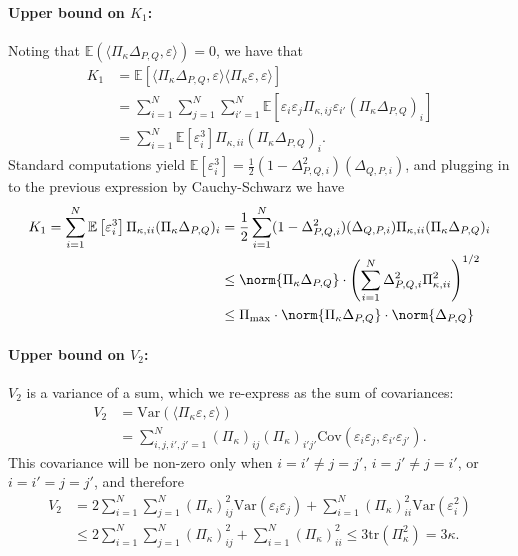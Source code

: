 \documentclass{article}
\newcommand{\dotp}[2]{\langle #1, #2 \rangle}
\newcommand{\Var}{\mathrm{Var}}
\newcommand{\Cov}{\mathrm{Cov}}
\newcommand{\1}{\mathbf{1}}
\newcommand{\Ebb}{\mathbb{E}}
\theoremstyle{alden}
\theoremstyle{aldenthm}
\theoremstyle{definition}
\theoremstyle{remark}
\begin{document}
\paragraph{Upper bound on $K_1$:}
Noting that $\Ebb(\dotp{\Pi_{\kappa} \Delta_{P,Q}}{\varepsilon}) = 0$, we have that
\begin{align*}
K_1 & = \Ebb\left[\dotp{\Pi_{\kappa} \Delta_{P,Q}}{\varepsilon} \dotp{\Pi_{\kappa} \varepsilon}{\varepsilon}\right] \\
& = \sum_{i = 1}^{N} \sum_{j = 1}^{N} \sum_{i' = 1}^{N} \Ebb\left[\varepsilon_i \varepsilon_j \Pi_{\kappa,ij} \varepsilon_{i'} (\Pi_{\kappa}\Delta_{P,Q})_i\right] \\
& = \sum_{i = 1}^{N} \Ebb\left[\varepsilon_i^3\right] \Pi_{\kappa,ii} (\Pi_{\kappa} \Delta_{P,Q})_i.
\end{align*}
Standard computations yield $\Ebb\left[\varepsilon_i^3\right]  = \frac{1}{2}(1 - \Delta_{P,Q,i}^2)(\Delta_{Q,P,i})$, and plugging in to the previous expression by Cauchy-Schwarz we have
\begin{align}
K_1 = \sum_{i = 1}^{N} \Ebb\left[\varepsilon_i^3\right] \Pi_{\kappa,ii}  (\Pi_{\kappa}\Delta_{P,Q})_i & = \frac{1}{2}\sum_{i = 1}^{N} (1 - \Delta_{P,Q,i}^2)(\Delta_{Q,P,i}) \Pi_{\kappa,ii}  (\Pi_{\kappa}\Delta_{P,Q})_i \nonumber \\
& \leq \norm{\Pi_{\kappa} \Delta_{P,Q}} \cdot \left(\sum_{i = 1}^{N} \Delta_{P,Q,i}^2 \Pi_{\kappa,ii}^2\right)^{1/2} \nonumber \\
& \leq \Pi_{\max} \cdot \norm{\Pi_{\kappa} \Delta_{P,Q}} \cdot \norm{\Delta_{P,Q}}  \label{eqn:var2} 
\end{align}

\paragraph{Upper bound on $V_2$:}
$V_2$ is a variance of a sum, which we re-express as the sum of covariances:
\begin{align*}
V_2 & = \Var(\dotp{\Pi_{\kappa} \varepsilon}{\varepsilon}) \\
& = \sum_{i,j,i',j' = 1}^{N} (\Pi_{\kappa})_{ij} (\Pi_{\kappa})_{i'j'} \Cov(\varepsilon_i \varepsilon_j, \varepsilon_{i'} \varepsilon_{j'}).
\end{align*}
This covariance will be non-zero only when $i = i' \neq j = j'$, $i = j' \neq j = i'$, or $i = i' = j = j'$, and therefore
\begin{align}
V_2 & = 2\sum_{i = 1}^{N}\sum_{j = 1}^{N} (\Pi_{\kappa})_{ij}^2 \Var(\varepsilon_i\varepsilon_j) + \sum_{i = 1}^{N} (\Pi_{\kappa})_{ii}^2 \Var(\varepsilon_i^2) \nonumber\\
& \leq 2\sum_{i = 1}^{N}\sum_{j = 1}^{N} (\Pi_{\kappa})_{ij}^2 + \sum_{i = 1}^{N} (\Pi_{\kappa})_{ii}^2 \leq 3 \mathrm{tr}(\Pi_{\kappa}^2) = 3\kappa. \label{eqn:var3}
\end{align}
\end{document}
